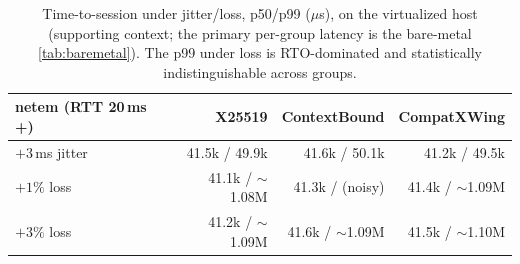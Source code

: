 \documentclass[journal]{IEEEtran}
\begin{document}
\begin{table}[t]\centering\footnotesize
\setlength{\tabcolsep}{2pt}\renewcommand{\arraystretch}{1.12}
\caption{Time-to-session under jitter/loss, p50/p99 ($\mu$s), on the virtualized host (supporting
context; the primary per-group latency is the bare-metal \cref{tab:baremetal}). The p99 under loss
is RTO-dominated and statistically indistinguishable across groups.}\label{tab:loss}
\begin{tabular}{@{}l r r r@{}}
\toprule
\textbf{netem (RTT 20\,ms +)} & \textbf{X25519} & \textbf{ContextBound} & \textbf{CompatXWing} \\
\midrule
$+3$\,ms jitter & 41.5k / 49.9k & 41.6k / 50.1k & 41.2k / 49.5k \\
$+1\%$ loss     & 41.1k / $\sim$1.08M & 41.3k / (noisy) & 41.4k / $\sim$1.09M \\
$+3\%$ loss     & 41.2k / $\sim$1.09M & 41.6k / $\sim$1.09M & 41.5k / $\sim$1.10M \\
\bottomrule
\end{tabular}
\end{table}
\end{document}
